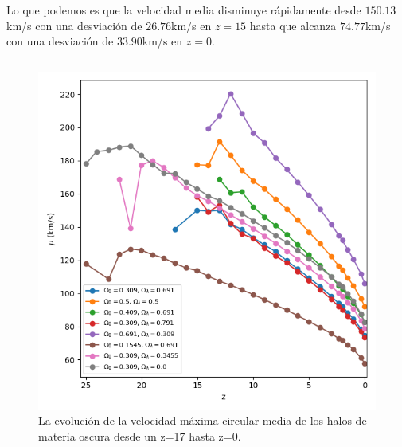\documentclass{beamer}
\begin{document}
	\begin{frame}
		\small Lo que podemos es que la velocidad media disminuye rápidamente desde $150.13$km/s con una desviación de $26.76$km/s en $z=15$ hasta que alcanza $74.77$km/s con una desviación de $33.90$km/s en $z=0$.
		
		\begin{columns}[t]
			\begin{column}{.5\textwidth}
				\begin{figure}
					\centering
					\includegraphics[scale=0.3]{Conc/VelMax_Mean_Conc.png}
					\caption{\footnotesize La evolución de la velocidad máxima circular media de los halos de materia oscura desde un z=17 hasta z=0.}
					\label{fig:Conc-VelMaxMean}
				\end{figure}
			\end{column}


\end{columns}
\end{frame}
\end{document}
